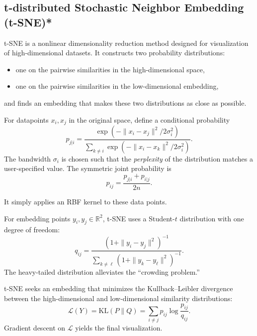 \documentclass[../main]{subfiles}
\begin{document}
\subsection{t-distributed Stochastic Neighbor Embedding (t-SNE)*}

t-SNE is a nonlinear dimensionality reduction method designed for visualization 
of high-dimensional datasets.  
It constructs two probability distributions:
\begin{itemize}
    \item one on the pairwise similarities in the high-dimensional space,  
    \item one on the pairwise similarities in the low-dimensional embedding,
\end{itemize}
and finds an embedding that makes these two distributions as close as possible.


\begin{definition}
For datapoints $x_i, x_j$ in the original space, define a conditional probability
\begin{equation}
    p_{j|i}
    = \frac{\exp\left(-\|x_i - x_j\|^2 / 2\sigma_i^2\right)}
            {\sum_{k \neq i} \exp\left(-\|x_i - x_k\|^2 / 2\sigma_i^2\right)}.
\end{equation}
The bandwidth $\sigma_i$ is chosen such that the \emph{perplexity}
of the distribution matches a user-specified value.
The symmetric joint probability is
\begin{equation}
    p_{ij} = \frac{p_{j|i} + p_{i|j}}{2n}.
\end{equation}
\end{definition}
\begin{note}
    It simply applies an RBF kernel to these data points.
\end{note}
\begin{definition}
For embedding points $y_i, y_j \in \mathbb{R}^2$,  
t-SNE uses a Student-\(t\) distribution with one degree of freedom:
\begin{equation}
    q_{ij}
    =
    \frac{\left(1 + \|y_i - y_j\|^2\right)^{-1}}
            {\sum_{k \neq \ell}
            \left(1 + \|y_k - y_\ell\|^2\right)^{-1}}.
\end{equation}
The heavy-tailed distribution alleviates the “crowding problem.”
\end{definition}

\begin{theorem}
t-SNE seeks an embedding that minimizes the Kullback–Leibler divergence
between the high-dimensional and low-dimensional similarity distributions:
\begin{equation}
    \mathcal{L}(Y)
    = \mathrm{KL}(P \parallel Q)
    = \sum_{i \neq j} p_{ij} \log \frac{p_{ij}}{q_{ij}}.
\end{equation}
Gradient descent on $\mathcal{L}$ yields the final visualization.
\end{theorem}
\end{document}
